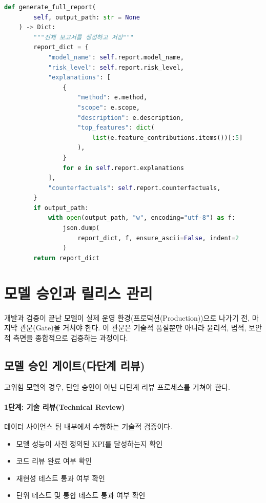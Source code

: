 \begin{lstlisting}[language=Python, caption={통합 설명가능성 보고서 생성기}, label={lst:xai_report}]
    def generate_full_report(
        self, output_path: str = None
    ) -> Dict:
        """전체 보고서를 생성하고 저장"""
        report_dict = {
            "model_name": self.report.model_name,
            "risk_level": self.report.risk_level,
            "explanations": [
                {
                    "method": e.method,
                    "scope": e.scope,
                    "description": e.description,
                    "top_features": dict(
                        list(e.feature_contributions.items())[:5]
                    ),
                }
                for e in self.report.explanations
            ],
            "counterfactuals": self.report.counterfactuals,
        }
        if output_path:
            with open(output_path, "w", encoding="utf-8") as f:
                json.dump(
                    report_dict, f, ensure_ascii=False, indent=2
                )
        return report_dict
\end{lstlisting}

\section{모델 승인과 릴리스 관리}
\label{sec:10.6}

개발과 검증이 끝난 모델이 실제 운영 환경(프로덕션(Production))으로 나가기 전, 마지막 관문(Gate)을 거쳐야 한다. 이 관문은 기술적 품질뿐만 아니라 윤리적, 법적, 보안적 측면을 종합적으로 검증하는 과정이다.

\subsection{모델 승인 게이트(다단계 리뷰)}
\label{sec:10.6.1}

고위험 모델의 경우, 단일 승인이 아닌 다단계 리뷰 프로세스를 거쳐야 한다.

\paragraph{1단계: 기술 리뷰(Technical Review)}
데이터 사이언스 팀 내부에서 수행하는 기술적 검증이다.
\begin{itemize}
  \item 모델 성능이 사전 정의된 KPI를 달성하는지 확인
  \item 코드 리뷰 완료 여부 확인
  \item 재현성 테스트 통과 여부 확인
  \item 단위 테스트 및 통합 테스트 통과 여부 확인
\end{itemize}

